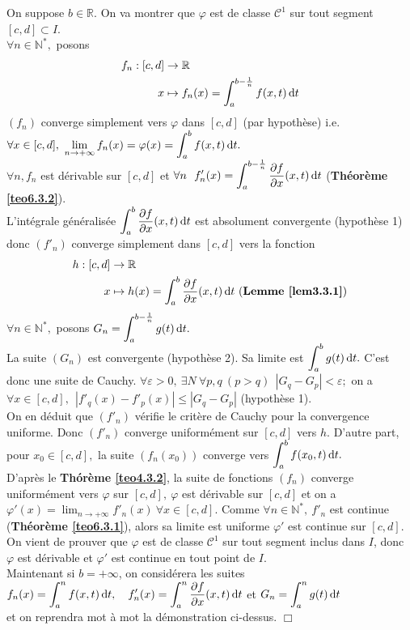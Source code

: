 \documentclass[11pt, a4paper]{book}
\newenvironment{pr}{\noindent {\bf Preuve} \noindent} {\hfill $\Box$\vskip 5mm}
\begin{document}
\begin{pr}\quad On suppose $b\in \mathbb{R}.$ On va montrer que $\varphi$ est de classe $\mathcal{C}^1$ sur tout segment $[c,d]\subset I.$ \\
$\forall n\in \mathbb{N}^*,$ posons \begin{align*}
f_n:[c,d]&\rightarrow\mathbb{R}\\ x&\mapsto f_n(x)=\int_a^{b-\frac{1}{n}}f(x,t)\,\mathrm{d} t
\end{align*}
$(f_n)$ converge simplement vers $\varphi$ dans $[c,d]$ (par hypoth\`ese) i.e. $\forall x\in [c,d],~{\displaystyle \lim_{n\rightarrow+\infty}f_n(x)=\varphi(x)=\int_a^bf(x,t)\,\mathrm{d} t.}$\\
$\forall n,f_n$ est d\'erivable sur $[c,d]$ et $\forall n~~{\displaystyle f'_n(x)= \int_a^{b-\frac{1}{n}}\dfrac{\partial f}{\partial x}(x,t)\,\mathrm{d} t }$ (\textbf{Th\'eor\`eme \ref{teo6.3.2}}).\\
L'int\'egrale g\'en\'eralis\'ee ${\displaystyle \int_a^b\dfrac{\partial f}{\partial x}(x,t)\,\mathrm{d} t}$ est absolument  convergente (hypoth\`ese 1) donc $(f'_n)$ converge simplement dans $[c,d]$ vers la fonction\begin{align*}
h:[c,d]&\rightarrow\mathbb{R}\\x&\mapsto h(x)=\int_a^b\dfrac{\partial f}{\partial x}(x,t)\,\mathrm{d} t~(\textbf{Lemme \ref{lem3.3.1}})
\end{align*} $\forall n\in \mathbb{N}^*,$ posons ${\displaystyle G_n=\int_a^{b-\frac{1}{n}}g(t)\,\mathrm{d} t}.$\\
La suite $(G_n)$ est convergente (hypoth\`ese 2). Sa limite est ${\displaystyle \int_a^bg(t)\,\mathrm{d} t}.$ C'est donc une suite de Cauchy. $\forall \varepsilon>0,~\exists N~\forall p,q~(p>q)~~|G_q-G_p|<\varepsilon;$ on a $\forall x\in [c,d], ~~|f'_q(x)-f'_p(x)|\leq |G_q-G_p|$ (hypoth\`ese 1). \\
On en d\'eduit que $(f'_n)$ v\'erifie le crit\`ere de Cauchy pour la convergence uniforme. Donc $(f'_n)$ converge uniform\'ement sur $[c,d]$ vers $h.$ D'autre part, pour $x_0\in [c,d],$ la suite $(f_n(x_0))$ converge vers ${\displaystyle \int_a^bf(x_0,t)\,\mathrm{d} t.}$\\
D'apr\`es le \textbf{Th\'or\`eme \ref{teo4.3.2}}, la suite de fonctions $(f_n)$ converge uniform\'ement vers $\varphi$ sur $[c,d],~\varphi$ est d\'erivable sur $[c,d]$ et on a ${\displaystyle \varphi'(x)=\lim_{n\rightarrow+\infty}f'_n(x)}~\forall x\in[c,d]$. Comme $\forall n\in \mathbb{N}^*,~f'_n$ est continue (\textbf{Th\'eor\`eme \ref{teo6.3.1}}), alors sa limite est uniforme $\varphi'$ est continue sur $[c,d]$. On vient de prouver que $\varphi$ est de classe $\mathcal{C}^1$ sur tout segment inclus dans $I$, donc $\varphi$ est d\'erivable et $\varphi'$ est continue en tout point de $I$.\\
Maintenant si $b=+\infty$, on consid\'erera les suites \\${\displaystyle f_n(x)=\int_a^nf(x,t)\,\mathrm{d} t},\quad {\displaystyle f'_n(x)=\int_a^n\dfrac{\partial f}{\partial x}(x,t)\,\mathrm{d}t}$  et ${\displaystyle G_n=\int_a^ng(t)\,\mathrm{d} t}$ \\et on reprendra mot \`a mot la d\'emonstration ci-dessus.
\end{pr}
\end{document}
